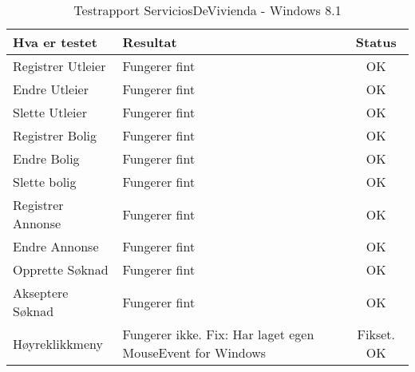 
\begin{table}
\center
\caption{Testrapport ServiciosDeVivienda  - Windows 8.1}
\label{tab:test2}

\begin{tabular}{|l|p{7cm}|c|}
\hline

\textbf{\large Hva er testet}
&
\textbf{\large Resultat}
&
\textbf{\large Status}
\\ \hline
Registrer Utleier
&
Fungerer fint
&
OK
\\ \hline
Endre Utleier
&
Fungerer fint
&
OK
\\ \hline
Slette Utleier
&
Fungerer fint
&
OK
\\ \hline
Registrer Bolig
&
Fungerer fint
&
OK
\\ \hline
Endre Bolig
&
Fungerer fint
&
OK
\\ \hline
Slette bolig
&
Fungerer fint
&
OK
\\ \hline
Registrer Annonse
&
Fungerer fint
&
OK
\\ \hline
Endre Annonse
&
Fungerer fint
&
OK
\\ \hline
Opprette Søknad
&
Fungerer fint
&
OK
\\ \hline
Akseptere Søknad
&
Fungerer fint
&
OK
\\ \hline
Høyreklikkmeny
&
Fungerer ikke. 
Fix: Har laget egen MouseEvent for Windows
&
Fikset. 
OK
\\ \hline


\end{tabular}
\end{table}